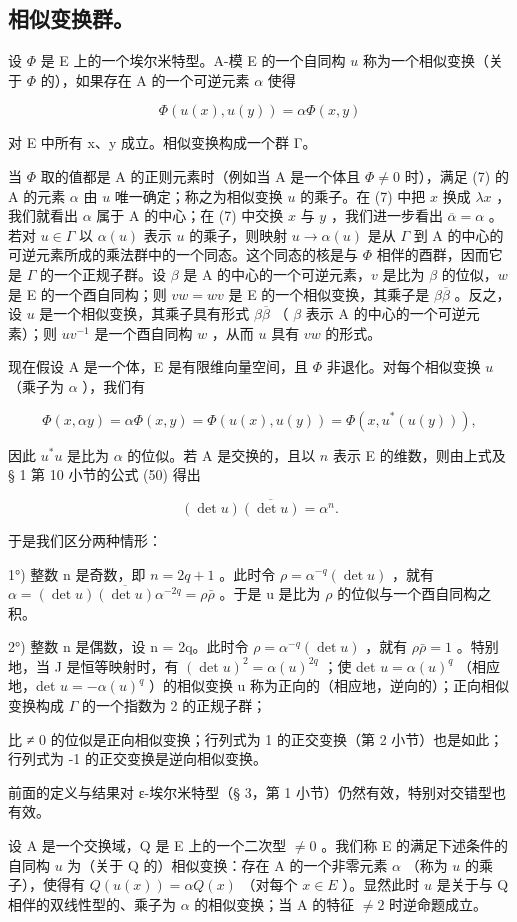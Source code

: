 \subsection{相似变换群。}

设 \(\Phi\) 是 E 上的一个埃尔米特型。A-模 E 的一个自同构 \(u\) 称为一个相似变换（关于 \(\Phi\) 的），如果存在 A 的一个可逆元素 \(\alpha\) 使得

\[
\Phi (u (x), u (y)) = \alpha \Phi (x, y)\tag{7}
\]

对 E 中所有 x、y 成立。相似变换构成一个群 Γ。

当 \(\Phi\) 取的值都是 A 的正则元素时（例如当 A 是一个体且 \(\Phi \neq 0\) 时），满足 (7) 的 A 的元素 \(\alpha\) 由 \(u\) 唯一确定；称之为相似变换 \(u\) 的乘子。在 (7) 中把 \(x\) 换成 \(\lambda x\) ，我们就看出 \(\alpha\) 属于 A 的中心；在 (7) 中交换 \(x\) 与 \(y\) ，我们进一步看出 \(\overline{\alpha} = \alpha\) 。若对 \(u \in \Gamma\) 以 \(\alpha(u)\) 表示 \(u\) 的乘子，则映射 \(u \to \alpha(u)\) 是从 \(\Gamma\) 到 A 的中心的可逆元素所成的乘法群中的一个同态。这个同态的核是与 \(\Phi\) 相伴的酉群，因而它是 \(\Gamma\) 的一个正规子群。设 \(\beta\) 是 A 的中心的一个可逆元素，\(v\) 是比为 \(\beta\) 的位似，\(w\) 是 E 的一个酉自同构；则 \(vw = wv\) 是 E 的一个相似变换，其乘子是 \(\beta\overline{\beta}\) 。反之，设 \(u\) 是一个相似变换，其乘子具有形式 \(\beta\overline{\beta}\) （ \(\beta\) 表示 A 的中心的一个可逆元素）；则 \(uv^{-1}\) 是一个酉自同构 \(w\) ，从而 \(u\) 具有 \(vw\) 的形式。

现在假设 A 是一个体，E 是有限维向量空间，且 \(\Phi\) 非退化。对每个相似变换 \(u\) （乘子为 \(\alpha\) ），我们有

\[
\Phi (x, \alpha y) = \alpha \Phi (x, y) = \Phi (u (x), u (y)) = \Phi (x, u ^ {*} (u (y))),
\]

因此 \(u^*u\) 是比为 \(\alpha\) 的位似。若 A 是交换的，且以 \(n\) 表示 E 的维数，则由上式及 § 1 第 10 小节的公式 (50) 得出

\[
(\det u) \overline {{(\det u)}} = \alpha^ {n}.\tag{8}
\]

于是我们区分两种情形：

1°) 整数 n 是奇数，即 \(n = 2q + 1\) 。此时令 \(\rho = \alpha^{-q}(\det u)\) ，就有 \(\alpha = (\det u) \overline{(\det u)} \alpha^{-2q} = \rho \bar{\rho}\) 。于是 u 是比为 \(\rho\) 的位似与一个酉自同构之积。

2°) 整数 n 是偶数，设 n = 2q。此时令 \(\rho = \alpha^{-q}(\det u)\) ，就有 \(\rho\bar{\rho} = 1\) 。特别地，当 J 是恒等映射时，有 \((\det u)^{2} = \alpha(u)^{2q}\) ；使 det \(u = \alpha(u)^{q}\) （相应地，det \(u = -\alpha(u)^{q}\) ）的相似变换 u 称为正向的（相应地，逆向的）；正向相似变换构成 \(\Gamma\) 的一个指数为 2 的正规子群；

比 ≠ 0 的位似是正向相似变换；行列式为 1 的正交变换（第 2 小节）也是如此；行列式为 -1 的正交变换是逆向相似变换。

前面的定义与结果对 ε-埃尔米特型（§ 3，第 1 小节）仍然有效，特别对交错型也有效。

设 A 是一个交换域，Q 是 E 上的一个二次型 \(\neq 0\) 。我们称 E 的满足下述条件的自同构 \(u\) 为（关于 Q 的）相似变换：存在 A 的一个非零元素 \(\alpha\) （称为 \(u\) 的乘子），使得有 \(Q(u(x)) = \alpha Q(x)\) （对每个 \(x \in E\) ）。显然此时 \(u\) 是关于与 Q 相伴的双线性型的、乘子为 \(\alpha\) 的相似变换；当 A 的特征 \(\neq 2\) 时逆命题成立。
